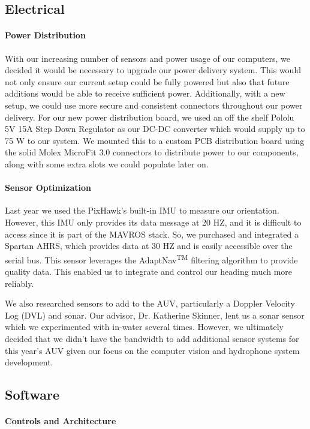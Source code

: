 \documentclass[conference]{IEEEtran}
\begin{document}
\subsection{Electrical}
    \paragraph{Power Distribution}
    With our increasing number of sensors and power usage of our computers, we decided it would be necessary to upgrade our power delivery system. This would not only ensure our current setup could be fully powered but also that future additions would be able to receive sufficient power. Additionally, with a new setup, we could use more secure and consistent connectors throughout our power delivery. For our new power distribution board, we used an off the shelf Pololu 5V 15A Step Down Regulator as our DC-DC converter which would supply up to 75 W to our system. We mounted this to a custom PCB distribution board using the solid Molex MicroFit 3.0 connectors to distribute power to our components, along with some extra slots we could populate later on. 

    \paragraph{Sensor Optimization}
    Last year we used the PixHawk's built-in IMU to measure our orientation. However, this IMU only provides its data message at 20 HZ, and it is difficult to access since it is part of the MAVROS stack. So, we purchased and integrated a Spartan AHRS, which provides data at 30 HZ and is easily accessible over the serial bus. This sensor leverages the AdaptNav\textsuperscript{TM} filtering algorithm to provide quality data. This enabled us to integrate and control our heading much more reliably.
    
    
    We also researched sensors to add to the AUV, particularly a Doppler Velocity Log (DVL) and sonar. Our advisor, Dr. Katherine Skinner, lent us a sonar sensor which we experimented with in-water several times. However, we ultimately decided that we didn't have the bandwidth to add additional sensor systems for this year's AUV given our focus on the computer vision and hydrophone system development.

\subsection{Software}
    \paragraph{Controls and Architecture}
    
\end{document}
